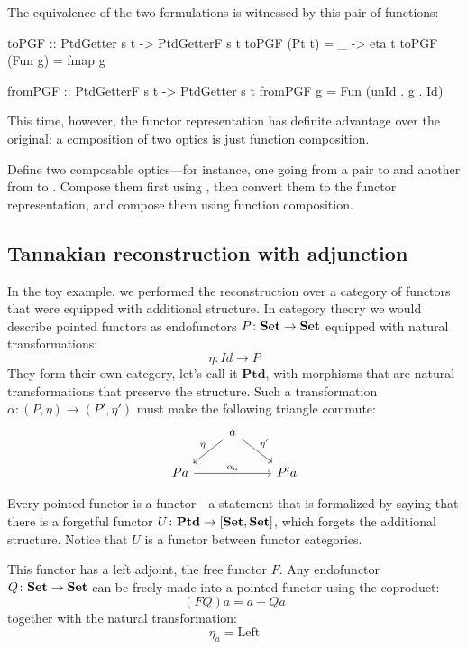 \documentclass[DaoFP]{subfiles}
\begin{document}
The equivalence of the two formulations is witnessed by this pair of functions:
\begin{haskell}
toPGF :: PtdGetter s t -> PtdGetterF s t
toPGF (Pt t) = \_ -> eta t
toPGF (Fun g) = fmap g

fromPGF :: PtdGetterF s t -> PtdGetter s t
fromPGF g = Fun (unId . g . Id)
\end{haskell}
This time, however, the functor representation has definite advantage over the original: a composition of two  optics is just function composition.
\begin{exercise}
Define two composable  optics---for instance, one going from a pair  to  and another from  to . Compose them first using , then convert them to the functor representation, and compose them using function composition.
\end{exercise}


\subsection{Tannakian reconstruction with adjunction}

In the toy example, we performed the reconstruction over a category of functors that were equipped with additional structure. In category theory we would describe pointed functors as endofunctors $P \colon \mathbf{Set} \to \mathbf{Set}$ equipped with natural transformations:
\[ \eta \colon Id \to P \]
They form their own category, let's call it $\mathbf{Ptd}$,  with morphisms that are natural transformations that preserve the structure. Such a transformation $\alpha \colon (P, \eta) \to (P', \eta')$ must make the following triangle commute:
\[
 \begin{tikzcd}
 & a
 \arrow[dl, "\eta"']
 \arrow[dr, "\eta'"]
 \\
 P a
 \arrow[rr, "\alpha_a"]
 && P' a
 \end{tikzcd}
\]

Every pointed functor is a functor---a statement that is formalized by saying that there is a forgetful functor $U \colon\mathbf{Ptd} \to [\mathbf{Set}, \mathbf{Set}]$, which forgets the additional structure. Notice that $U$ is a functor between functor categories. 

This functor has a left adjoint, the free functor $F$. Any endofunctor $Q \colon \mathbf{Set} \to \mathbf{Set}$ can be freely made into a pointed functor using the coproduct:
\[ (F Q) a = a + Q a \]
together with the natural transformation:
\[ \eta_a = \text{Left} \]
\end{document}
